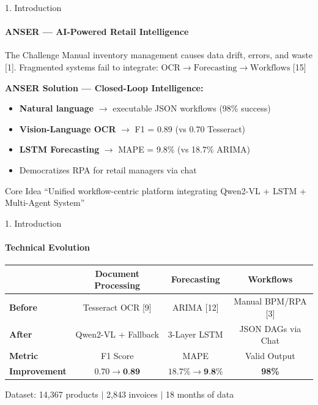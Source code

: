 \documentclass[10pt]{beamer}
\begin{document}
\begin{frame}{1. Introduction}
    \framesubtitle{ANSER --- AI-Powered Retail Intelligence}
    \begin{block}{The Challenge}
        Manual inventory management causes data drift, errors, and waste [1].
        Fragmented systems fail to integrate: $\text{OCR} \rightarrow \text{Forecasting} \rightarrow \text{Workflows}$ [15]
    \end{block}
    \vspace{0.3cm}
    \textbf{ANSER Solution --- Closed-Loop Intelligence:}
    \begin{itemize}
        \item \textbf{Natural language} $\rightarrow$ executable JSON workflows (98\% success)
        \item \textbf{Vision-Language OCR} $\rightarrow$ F1 = 0.89 (vs 0.70 Tesseract)
        \item \textbf{LSTM Forecasting} $\rightarrow$ MAPE = 9.8\% (vs 18.7\% ARIMA)
        \item Democratizes RPA for retail managers via chat
    \end{itemize}
    \vfill
    \begin{block}{Core Idea}
        ``Unified workflow-centric platform integrating Qwen2-VL + LSTM + Multi-Agent System''
    \end{block}
\end{frame}

\begin{frame}{1. Introduction}
    \framesubtitle{Technical Evolution}
    \begin{table}
        \centering
        \small
        \begin{tabular}{lccc}
            \toprule
            & \textbf{Document Processing} & \textbf{Forecasting} & \textbf{Workflows} \\
            \midrule
            \textbf{Before} & Tesseract OCR [9] & ARIMA [12] & Manual BPM/RPA [3] \\
            \textbf{After}  & Qwen2-VL + Fallback & 3-Layer LSTM & JSON DAGs via Chat \\
            \midrule
            \textbf{Metric} & F1 Score & MAPE & Valid Output \\
            \textbf{Improvement} & $0.70 \rightarrow \textbf{0.89}$ & $18.7\% \rightarrow \textbf{9.8\%}$ & \textbf{98\%} \\
            \bottomrule
        \end{tabular}
    \end{table}
    \vfill
    \centering
    \small{Dataset: 14,367 products $|$ 2,843 invoices $|$ 18 months of data}
\end{frame}
\end{document}
